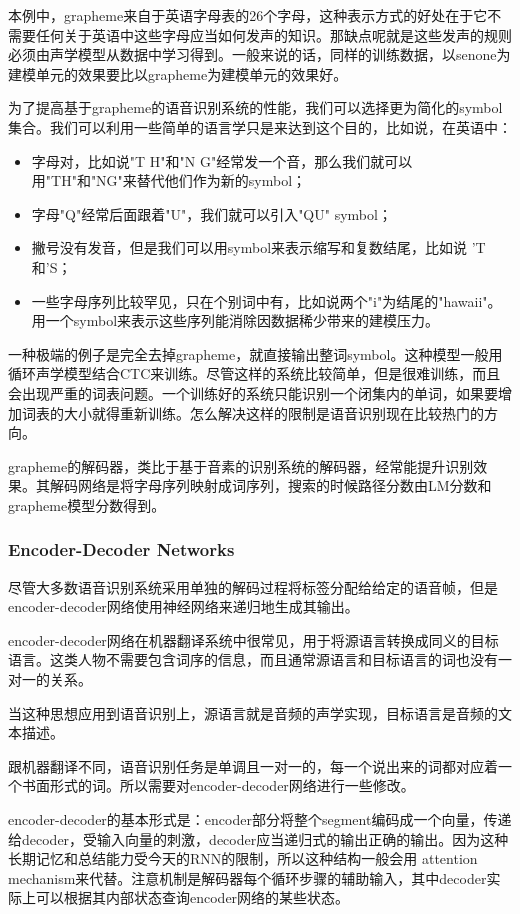 {本例中，grapheme来自于英语字母表的26个字母，这种表示方式的好处在于它不需要任何关于英语中这些字母应当如何发声的知识。那缺点呢就是这些发声的规则必须由声学模型从数据中学习得到。一般来说的话，同样的训练数据，以senone为建模单元的效果要比以grapheme为建模单元的效果好。

为了提高基于grapheme的语音识别系统的性能，我们可以选择更为简化的symbol集合。我们可以利用一些简单的语言学只是来达到这个目的，比如说，在英语中：
\begin{itemize}
	\item 字母对，比如说"T H"和"N G"经常发一个音，那么我们就可以用"TH"和"NG"来替代他们作为新的symbol；
	\item 字母"Q"经常后面跟着"U"，我们就可以引入"QU" symbol；
	\item 撇号没有发音，但是我们可以用symbol来表示缩写和复数结尾，比如说 'T和'S；
	\item 一些字母序列比较罕见，只在个别词中有，比如说两个"i"为结尾的"hawaii"。用一个symbol来表示这些序列能消除因数据稀少带来的建模压力。
\end{itemize}

一种极端的例子是完全去掉grapheme，就直接输出整词symbol。这种模型一般用循环声学模型结合CTC来训练。尽管这样的系统比较简单，但是很难训练，而且会出现严重的词表问题。一个训练好的系统只能识别一个闭集内的单词，如果要增加词表的大小就得重新训练。怎么解决这样的限制是语音识别现在比较热门的方向。

grapheme的解码器，类比于基于音素的识别系统的解码器，经常能提升识别效果。其解码网络是将字母序列映射成词序列，搜索的时候路径分数由LM分数和grapheme模型分数得到。

\subsubsection{Encoder-Decoder Networks} 
\label{ssub:encoder_decoder_networks}
尽管大多数语音识别系统采用单独的解码过程将标签分配给给定的语音帧，但是encoder-decoder网络使用神经网络来递归地生成其输出。

encoder-decoder网络在机器翻译系统中很常见，用于将源语言转换成同义的目标语言。这类人物不需要包含词序的信息，而且通常源语言和目标语言的词也没有一对一的关系。

当这种思想应用到语音识别上，源语言就是音频的声学实现，目标语言是音频的文本描述。

跟机器翻译不同，语音识别任务是单调且一对一的，每一个说出来的词都对应着一个书面形式的词。所以需要对encoder-decoder网络进行一些修改。

encoder-decoder的基本形式是：encoder部分将整个segment编码成一个向量，传递给decoder，受输入向量的刺激，decoder应当递归式的输出正确的输出。因为这种长期记忆和总结能力受今天的RNN的限制，所以这种结构一般会用 attention mechanism来代替。注意机制是解码器每个循环步骤的辅助输入，其中decoder实际上可以根据其内部状态查询encoder网络的某些状态。

}
